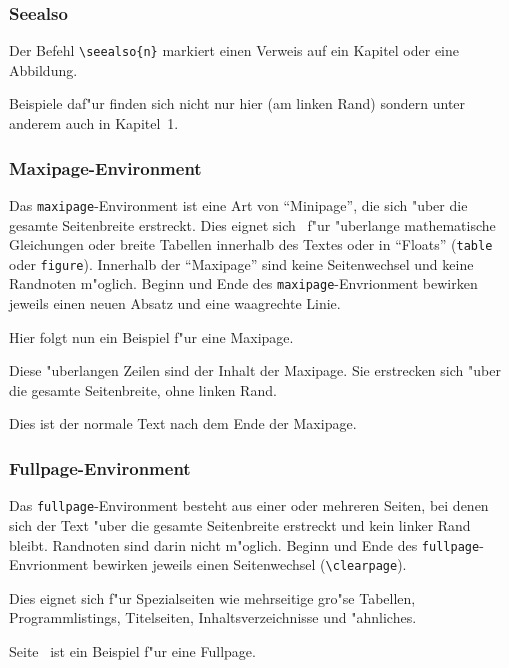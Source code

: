 \subsubsection{Seealso}

Der Befehl \verb|\seealso{n}| markiert einen Verweis auf ein Kapitel 
oder eine Abbildung.

Beispiele daf"ur finden sich nicht nur hier (am linken Rand) 
sondern unter anderem auch in  Kapitel~1.


\subsubsection{Maxipage-Environment}

Das {\tt maxipage}-Environment ist eine Art von "`Minipage"', die sich 
"uber die gesamte Seitenbreite erstreckt. Dies eignet sich \zB\ f"ur 
"uberlange mathematische Gleichungen oder breite Tabellen innerhalb des 
Textes oder in "`Floats"' ({\tt table} oder {\tt figure}). Innerhalb 
der "`Maxipage"' sind keine Seitenwechsel und keine Randnoten 
m"oglich. Beginn und Ende des {\tt maxipage}-Envrionment bewirken 
jeweils einen neuen Absatz und eine waagrechte Linie.

Hier folgt nun ein Beispiel f"ur eine Maxipage.\nopagebreak
\begin{maxipage}
Diese "uberlangen Zeilen sind der Inhalt der Maxipage. Sie erstrecken 
sich "uber die gesamte Seitenbreite, ohne linken 
Rand.
\end{maxipage}\nopagebreak
Dies ist der normale Text nach dem Ende der Maxipage.

\subsubsection{Fullpage-Environment} \label{fullpage}

Das {\tt fullpage}-Environment besteht aus einer oder mehreren 
Seiten, bei denen sich der Text "uber die gesamte Seitenbreite 
erstreckt und kein linker Rand bleibt. Randnoten sind darin nicht 
m"oglich. Beginn und Ende des {\tt fullpage}-Envrionment bewirken 
jeweils einen Seitenwechsel (\verb|\clearpage|).

Dies eignet sich f"ur Spezialseiten wie mehrseitige gro"se 
Tabellen, Programmlistings, Titelseiten, Inhaltsverzeichnisse und 
"ahnliches.

Seite~\pageref{bild} ist ein Beispiel f"ur eine Fullpage.

